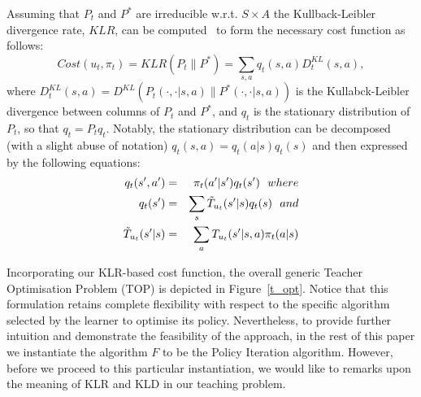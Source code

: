  Assuming that
$P_t$ and $P^*$ are irreducible w.r.t. $S\times A$ the
Kullback-Leibler divergence rate, $KLR$, can be
computed~\cite{rached_alajaji_campbell_2004} to form the necessary
cost function as follows:
$$
Cost(u_t,\pi_t)=KLR(P_t\|P^*)=\sum\limits_{s,a}q_t(s,a)D^{KL}_t(s,a),$$
where
$D^{KL}_t(s,a)=D^{KL}(P_t(\cdot,\cdot|s,a)\|P^*(\cdot,\cdot|s,a))$ is
the Kullabck-Leibler divergence between columns of $P_t$ and $P^*$,
and $q_t$ is the stationary distribution of $P_t$, so that
$q_t=P_tq_t$. Notably, the
stationary distribution can be decomposed (with a slight abuse of
notation) $q_t(s,a)=q_t(a|s)q_t(s)$ and then expressed by the
following equations:
\begin{eqnarray*}
q_t(s',a')&=&\pi_t(a'|s')q_t(s')\ \ \displaystyle{where}\\
q_t(s')&=&\sum\limits_s\Tilde{T}_{u_t}(s'|s)q_t(s) \ \ \displaystyle{and}\\
\Tilde{T}_{u_t}(s'|s)&=&\sum_{a}T_{u_t}(s'|s,a)\pi_t(a|s)
\end{eqnarray*}

Incorporating our KLR-based cost function, the overall generic Teacher
Optimisation Problem (TOP) is depicted in Figure~\ref{t_opt}. Notice
that this formulation retains complete flexibility with respect to the
specific algorithm selected by the learner to optimise its
policy. Nevertheless, to provide further intuition and demonstrate the
feasibility of the approach, in the rest of this paper we instantiate
the algorithm $F$ to be the Policy Iteration algorithm. However,
before we proceed to this particular instantiation, we would like to
remarks upon the meaning of KLR and KLD in our teaching problem.

